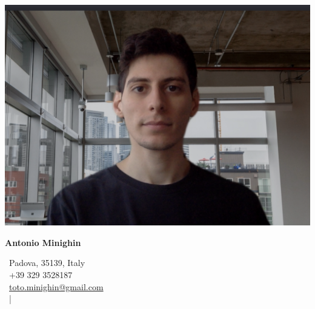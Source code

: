 \documentclass[a4paper, 11pt]{article}
\begin{document}
\begin{minipage}{0.2\textwidth}
    \includegraphics[scale=0.2]{images/fotoSkype.png}
\end{minipage}
\begin{minipage}{0.6\textwidth}
    \begin{center}
        \textbf{\LARGE Antonio Minighin}
    \end{center}
    \begin{center}
        \faHome \ Padova, 35139, Italy \\
        \faMobile \ +39 329 3528187 \\
        \faPaperPlane \ \href{mailto://toto.minighin@gmail.com}{toto.minighin@gmail.com} \\
        \href{https://github.com/antomini}{\faGithub} \ | \
        \href{https://linkedin.com/in/antonio-minighin-b92074236}{\faLinkedinSquare}
    \end{center}
\end{minipage}














\end{document}
